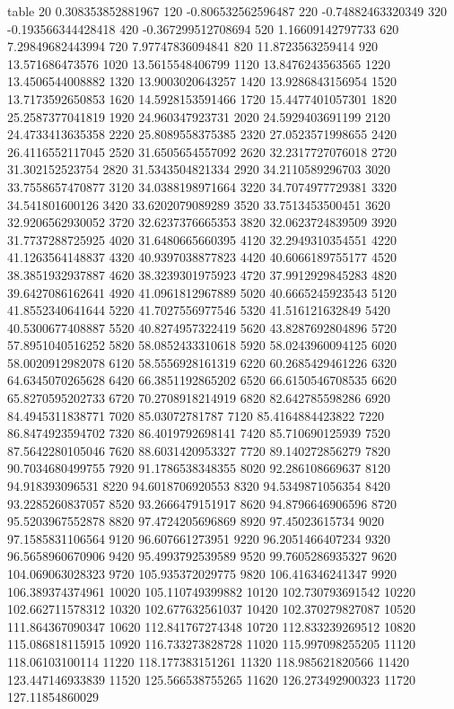 table {%
20 0.308353852881967
120 -0.806532562596487
220 -0.74882463320349
320 -0.193566344428418
420 -0.367299512708694
520 1.16609142797733
620 7.29849682443994
720 7.97747836094841
820 11.8723563259414
920 13.571686473576
1020 13.5615548406799
1120 13.8476243563565
1220 13.4506544008882
1320 13.9003020643257
1420 13.9286843156954
1520 13.7173592650853
1620 14.5928153591466
1720 15.4477401057301
1820 25.2587377041819
1920 24.960347923731
2020 24.5929403691199
2120 24.4733413635358
2220 25.8089558375385
2320 27.0523571998655
2420 26.4116552117045
2520 31.6505654557092
2620 32.2317727076018
2720 31.302152523754
2820 31.5343504821334
2920 34.2110589296703
3020 33.7558657470877
3120 34.0388198971664
3220 34.7074977729381
3320 34.541801600126
3420 33.6202079089289
3520 33.7513453500451
3620 32.9206562930052
3720 32.6237376665353
3820 32.0623724839509
3920 31.7737288725925
4020 31.6480665660395
4120 32.2949310354551
4220 41.1263564148837
4320 40.9397038877823
4420 40.6066189755177
4520 38.3851932937887
4620 38.3239301975923
4720 37.9912929845283
4820 39.6427086162641
4920 41.0961812967889
5020 40.6665245923543
5120 41.8552340641644
5220 41.7027556977546
5320 41.516121632849
5420 40.5300677408887
5520 40.8274957322419
5620 43.8287692804896
5720 57.8951040516252
5820 58.0852433310618
5920 58.0243960094125
6020 58.0020912982078
6120 58.5556928161319
6220 60.2685429461226
6320 64.6345070265628
6420 66.3851192865202
6520 66.6150546708535
6620 65.8270595202733
6720 70.2708918214919
6820 82.642785598286
6920 84.4945311838771
7020 85.03072781787
7120 85.4164884423822
7220 86.8474923594702
7320 86.4019792698141
7420 85.710690125939
7520 87.5642280105046
7620 88.6031420953327
7720 89.140272856279
7820 90.7034680499755
7920 91.1786538348355
8020 92.286108669637
8120 94.918393096531
8220 94.6018706920553
8320 94.5349871056354
8420 93.2285260837057
8520 93.2666479151917
8620 94.8796646906596
8720 95.5203967552878
8820 97.4724205696869
8920 97.45023615734
9020 97.1585831106564
9120 96.607661273951
9220 96.2051466407234
9320 96.5658960670906
9420 95.4993792539589
9520 99.7605286935327
9620 104.069063028323
9720 105.935372029775
9820 106.416346241347
9920 106.389374374961
10020 105.110749399882
10120 102.730793691542
10220 102.662711578312
10320 102.677632561037
10420 102.370279827087
10520 111.864367090347
10620 112.841767274348
10720 112.833239269512
10820 115.086818115915
10920 116.733273828728
11020 115.997098255205
11120 118.06103100114
11220 118.177383151261
11320 118.985621820566
11420 123.447146933839
11520 125.566538755265
11620 126.273492900323
11720 127.11854860029
}
